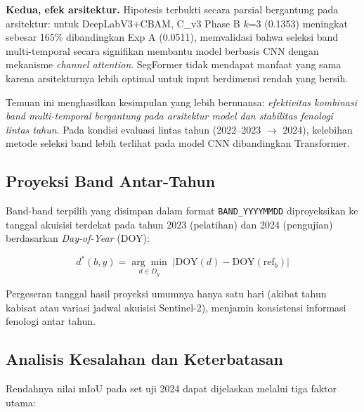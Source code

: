 \textbf{Kedua, efek arsitektur.}
Hipotesis terbukti secara parsial bergantung pada arsitektur:
untuk DeepLabV3+CBAM, C\_v3 Phase B $k$=3 (0.1353) meningkat sebesar 165\% dibandingkan
Exp A (0.0511), memvalidasi bahwa seleksi band multi-temporal secara signifikan membantu
model berbasis CNN dengan mekanisme \textit{channel attention}.
SegFormer tidak mendapat manfaat yang sama karena arsitekturnya lebih optimal untuk input
berdimensi rendah yang bersih.

Temuan ini menghasilkan kesimpulan yang lebih bernuansa: \textit{efektivitas kombinasi band
multi-temporal bergantung pada arsitektur model dan stabilitas fenologi lintas tahun}.
Pada kondisi evaluasi lintas tahun (2022--2023 $\to$ 2024), kelebihan metode seleksi band
lebih terlihat pada model CNN dibandingkan Transformer.

\subsection{Proyeksi Band Antar-Tahun}

Band-band terpilih yang disimpan dalam format \texttt{BAND\_YYYYMMDD} diproyeksikan ke
tanggal akuisisi terdekat pada tahun 2023 (pelatihan) dan 2024 (pengujian) berdasarkan
\textit{Day-of-Year} (DOY):

\begin{equation}
    d^*(b, y) = \underset{d \in D_y}{\arg\min}\; \left| \text{DOY}(d) - \text{DOY}(\text{ref}_b) \right|
\end{equation}

Pergeseran tanggal hasil proyeksi umumnya hanya satu hari (akibat tahun kabisat atau
variasi jadwal akuisisi Sentinel-2), menjamin konsistensi informasi fenologi antar tahun.

\subsection{Analisis Kesalahan dan Keterbatasan}

Rendahnya nilai mIoU pada set uji 2024 dapat dijelaskan melalui tiga faktor utama:

